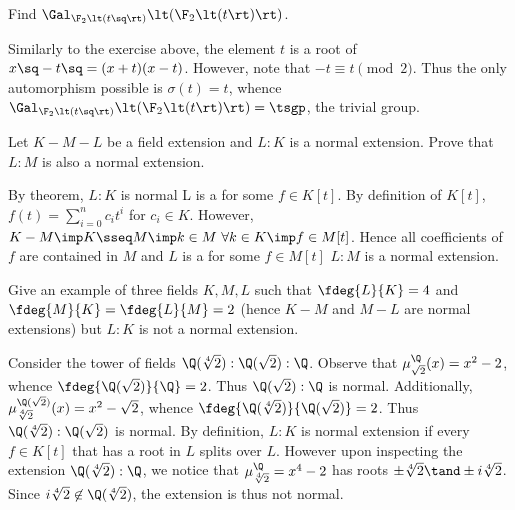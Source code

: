 \documentclass{article}
\begin{document}
\begin{subexercise}
  Find \( \Gal_{\F_2\lt(t\sq\rt)}\lt(\F_2\lt(t\rt)\rt) \).
\end{subexercise}
\begin{solution}
  Similarly to the exercise above, the element \( t \) is a root of \( x\sq-t\sq = (x+t)(x-t) \).
  However, note that \( -t \equiv t \pmod 2 \).
  Thus the only automorphism possible is \( \sigma(t) = t \), whence \( \Gal_{\F_2\lt(t\sq\rt)}\lt(\F_2\lt(t\rt)\rt) = \tsgp \), the trivial group.
\end{solution}

\begin{subexercise}
  Let \( K - M - L \) be a field extension and \( L:K \) is a normal extension.
  Prove that \( L:M \) is also a normal extension.
\end{subexercise}
\begin{solution}
By theorem, \( L:K \) is normal \iff L is a \sf for some \( f\in K[t] \).
By definition of \( K[t] \), \( f(t)=\sum\limits_{i=0}^n c_it^i \) for \( c_i\in K \).
However, \( K-M\imp K\sseq M \imp k\in M \ \forall k\in K \imp f\in M[t] \).
Hence all coefficients of \( f \) are contained in \( M \) and \( L \) is a \sf for some \( f\in M[t] \) \iff \( L:M \) is a normal extension.
\end{solution}

\begin{subexercise}
  Give an example of three fields \( K, M, L \) such that \( \fdeg{L}{K} = 4 \) and \( \fdeg{M}{K} = \fdeg{L}{M} = 2 \) (hence \( K-M \) and \( M-L \) are normal extensions) but \( L : K \) is not a normal extension.
\end{subexercise}
\begin{solution}
Consider the tower of fields \( \Q(\sqrt[4]2):\Q(\sqrt 2):\Q \).
Observe that \( \mu_{\sqrt 2}^\Q(x) = x^2-2 \), whence \( \fdeg{\Q(\sqrt 2)}{\Q} = 2 \).
Thus \( \Q(\sqrt 2):\Q \) is normal.
Additionally, \( \mu_{\sqrt[4] 2}^{\Q(\sqrt 2)}(x) = x^2-\sqrt 2 \), whence \( \fdeg{\Q(\sqrt[4] 2)}{\Q(\sqrt 2)} = 2 \).
Thus \( \Q(\sqrt[4] 2):\Q(\sqrt 2) \) is normal.
By definition, \( L:K \) is normal extension if every \( f\in K[t] \) that has a root in \( L \) splits over \( L \).
However upon inspecting the extension \( \Q(\sqrt[4]2):\Q \), we notice that \( \mu_{\sqrt[4]2}^\Q = x^4-2 \) has roots \( \pm\sqrt[4]2 \tand \pm i\sqrt[4]2 \).
Since \( i\sqrt[4]2 \not\in \Q(\sqrt[4]2) \), the extension is thus not normal.
\end{solution}
\end{document}
